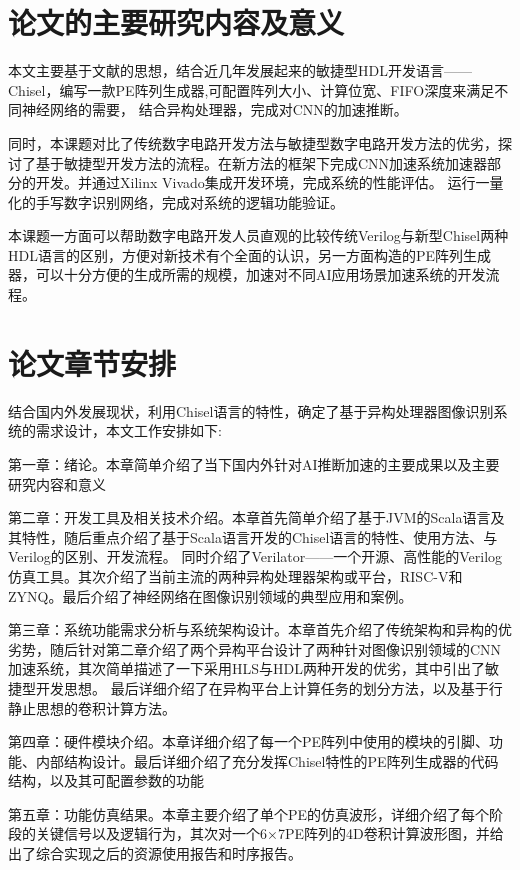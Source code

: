 \section{论文的主要研究内容及意义}
    本文主要基于文献\cite{chen2017eyeriss}的思想，结合近几年发展起来的敏捷型HDL开发语言——Chisel，编写一款PE阵列生成器,可配置阵列大小、计算位宽、FIFO深度来满足不同神经网络的需要，
    结合异构处理器，完成对CNN的加速推断。

    同时，本课题对比了传统数字电路开发方法与敏捷型数字电路开发方法的优劣，探讨了基于敏捷型开发方法的流程。在新方法的框架下完成CNN加速系统加速器部分的开发。并通过Xilinx Vivado集成开发环境，完成系统的性能评估。
    运行一量化的手写数字识别网络，完成对系统的逻辑功能验证。

    本课题一方面可以帮助数字电路开发人员直观的比较传统Verilog与新型Chisel两种HDL语言的区别，方便对新技术有个全面的认识，另一方面构造的PE阵列生成器，可以十分方便的生成所需的规模，加速对不同AI应用场景加速系统的开发流程。

\section{论文章节安排}
    结合国内外发展现状，利用Chisel语言的特性，确定了基于异构处理器图像识别系统的需求设计，本文工作安排如下:

    第一章：绪论。本章简单介绍了当下国内外针对AI推断加速的主要成果以及主要研究内容和意义

    第二章：开发工具及相关技术介绍。本章首先简单介绍了基于JVM的Scala语言及其特性，随后重点介绍了基于Scala语言开发的Chisel语言的特性、使用方法、与Verilog的区别、开发流程。
    同时介绍了Verilator——一个开源、高性能的Verilog仿真工具。其次介绍了当前主流的两种异构处理器架构或平台，RISC-V和ZYNQ。最后介绍了神经网络在图像识别领域的典型应用和案例。

    第三章：系统功能需求分析与系统架构设计。本章首先介绍了传统架构和异构的优劣势，随后针对第二章介绍了两个异构平台设计了两种针对图像识别领域的CNN加速系统，其次简单描述了一下采用HLS与HDL两种开发的优劣，其中引出了敏捷型开发思想。
    最后详细介绍了在异构平台上计算任务的划分方法，以及基于行静止思想的卷积计算方法。
    
    第四章：硬件模块介绍。本章详细介绍了每一个PE阵列中使用的模块的引脚、功能、内部结构设计。最后详细介绍了充分发挥Chisel特性的PE阵列生成器的代码结构，以及其可配置参数的功能

    第五章：功能仿真结果。本章主要介绍了单个PE的仿真波形，详细介绍了每个阶段的关键信号以及逻辑行为，其次对一个6×7PE阵列的4D卷积计算波形图，并给出了综合实现之后的资源使用报告和时序报告。

